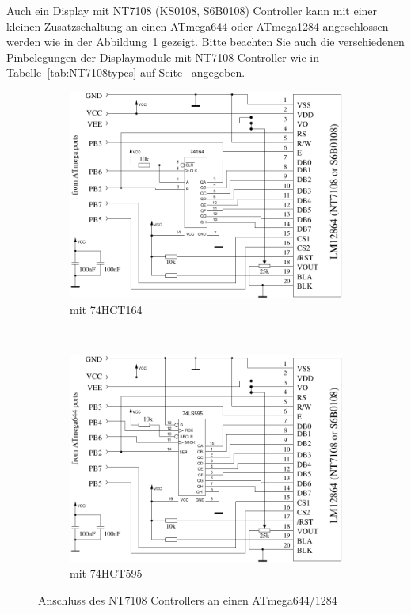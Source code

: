 Auch ein Display mit NT7108 (KS0108, S6B0108) Controller kann mit einer kleinen Zusatzschaltung an einen
ATmega644 oder ATmega1284 angeschlossen werden wie in der Abbildung~\ref{fig:NT7108lcd_644} gezeigt.
Bitte beachten Sie auch die verschiedenen Pinbelegungen der Displaymodule mit NT7108 Controller wie in
Tabelle~\ref{tab:NT7108types} auf Seite~\pageref{tab:NT7108types} angegeben.

\begin{figure}[H]
  \begin{subfigure}[b]{.5\textwidth}	%
    \centering
    \includegraphics[width=.88\textwidth]{../FIG/ST7108serial164_644.pdf}	%
    \caption{mit 74HCT164}
  \end{subfigure}
~
  \begin{subfigure}[b]{.5\textwidth}	%
    \centering
    \includegraphics[width=.88\textwidth]{../FIG/ST7108serial595_644.pdf}	%
    \caption{mit 74HCT595}
  \end{subfigure}
  \caption{Anschluss des NT7108 Controllers an einen ATmega644/1284}
\label{fig:NT7108lcd_644}
\end{figure}

